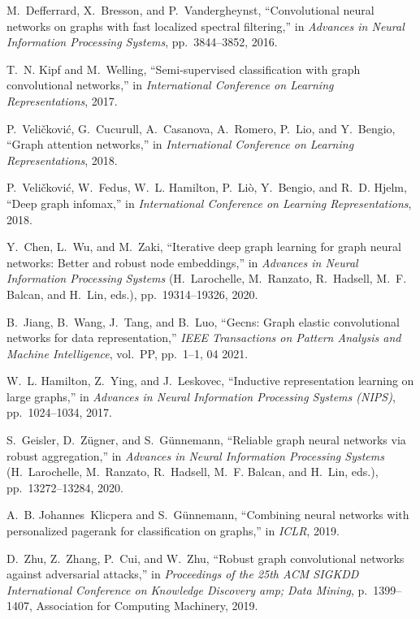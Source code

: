 \documentclass{article}
\begin{document}
\begin{thebibliography}{10}

M.~Defferrard, X.~Bresson, and P.~Vandergheynst, ``Convolutional neural
  networks on graphs with fast localized spectral filtering,'' in {\em Advances
  in Neural Information Processing Systems}, pp.~3844--3852, 2016.
 
T.~N. Kipf and M.~Welling, ``Semi-supervised classification with graph
  convolutional networks,'' in {\em International Conference on Learning
  Representations}, 2017.

P.~Veli{\v{c}}kovi{\'c}, G.~Cucurull, A.~Casanova, A.~Romero, P.~Lio, and
  Y.~Bengio, ``Graph attention networks,'' in {\em International Conference on
  Learning Representations}, 2018.
 
P.~Veli{\v{c}}kovi{\'c}, W.~Fedus, W.~L. Hamilton, P.~Li{\`o}, Y.~Bengio, and
  R.~D. Hjelm, ``Deep graph infomax,'' in {\em International Conference on
  Learning Representations}, 2018.
 
Y.~Chen, L.~Wu, and M.~Zaki, ``Iterative deep graph learning for graph neural
  networks: Better and robust node embeddings,'' in {\em Advances in Neural
  Information Processing Systems} (H.~Larochelle, M.~Ranzato, R.~Hadsell, M.~F.
  Balcan, and H.~Lin, eds.), pp.~19314--19326, 2020.
  
B.~Jiang, B.~Wang, J.~Tang, and B.~Luo, ``Gecns: Graph elastic convolutional
  networks for data representation,'' {\em IEEE Transactions on Pattern
  Analysis and Machine Intelligence}, vol.~PP, pp.~1--1, 04 2021.
  
W.~L. Hamilton, Z.~Ying, and J.~Leskovec, ``Inductive representation learning
  on large graphs,'' in {\em Advances in Neural Information Processing Systems
  (NIPS)}, pp.~1024--1034, 2017.
  
S.~Geisler, D.~Z\"{u}gner, and S.~G\"{u}nnemann, ``Reliable graph neural
  networks via robust aggregation,'' in {\em Advances in Neural Information
  Processing Systems} (H.~Larochelle, M.~Ranzato, R.~Hadsell, M.~F. Balcan, and
  H.~Lin, eds.), pp.~13272--13284, 2020.
  
A.~B. Johannes~Klicpera and S.~G{\"u}nnemann, ``Combining neural networks with
  personalized pagerank for classification on graphs,'' in {\em ICLR}, 2019.
  
D.~Zhu, Z.~Zhang, P.~Cui, and W.~Zhu, ``Robust graph convolutional networks
  against adversarial attacks,'' in {\em Proceedings of the 25th ACM SIGKDD
  International Conference on Knowledge Discovery amp; Data Mining},
  p.~1399–1407, Association for Computing Machinery, 2019.
  

\end{thebibliography}
\end{document}
